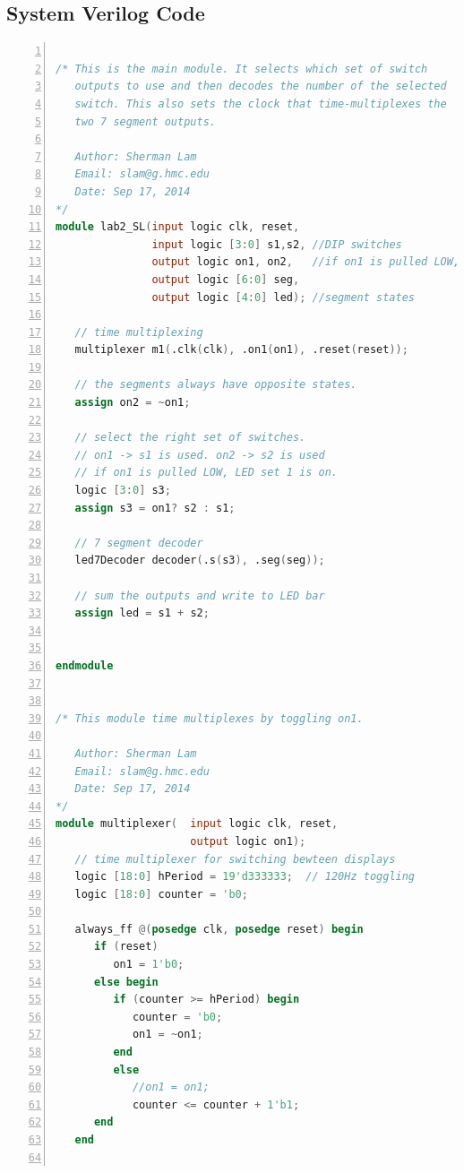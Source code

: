 \documentclass[11pt]{article}
\begin{document}
\clearpage
\subsection{System Verilog Code}

\begin{lstlisting}[language=Verilog,numbers=left,basicstyle=\footnotesize]

/* This is the main module. It selects which set of switch
   outputs to use and then decodes the number of the selected
   switch. This also sets the clock that time-multiplexes the 
   two 7 segment outputs.
   
   Author: Sherman Lam
   Email: slam@g.hmc.edu
   Date: Sep 17, 2014
*/
module lab2_SL(input logic clk, reset,
               input logic [3:0] s1,s2, //DIP switches
               output logic on1, on2,   //if on1 is pulled LOW, LED set 1 is on.
               output logic [6:0] seg,
               output logic [4:0] led); //segment states    
   
   // time multiplexing
   multiplexer m1(.clk(clk), .on1(on1), .reset(reset));
   
   // the segments always have opposite states.
   assign on2 = ~on1;      
   
   // select the right set of switches.
   // on1 -> s1 is used. on2 -> s2 is used
   // if on1 is pulled LOW, LED set 1 is on.
   logic [3:0] s3;
   assign s3 = on1? s2 : s1;  
   
   // 7 segment decoder
   led7Decoder decoder(.s(s3), .seg(seg));
   
   // sum the outputs and write to LED bar
   assign led = s1 + s2;
   
   
endmodule


/* This module time multiplexes by toggling on1.

   Author: Sherman Lam
   Email: slam@g.hmc.edu
   Date: Sep 17, 2014
*/
module multiplexer(  input logic clk, reset,
                     output logic on1);
   // time multiplexer for switching bewteen displays
   logic [18:0] hPeriod = 19'd333333;  // 120Hz toggling
   logic [18:0] counter = 'b0;
      
   always_ff @(posedge clk, posedge reset) begin
      if (reset)     
         on1 = 1'b0;
      else begin
         if (counter >= hPeriod) begin
            counter = 'b0;
            on1 = ~on1;
         end
         else
            //on1 = on1;
            counter <= counter + 1'b1;
      end
   end
   

\end{lstlisting}
\end{document}
